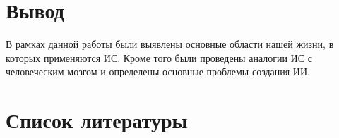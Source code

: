 \documentclass[14pt,a4paper,report]{report}
\begin{document}
\section{Вывод}

В рамках данной работы были выявлены основные области нашей жизни, в которых применяются ИС. Кроме того были проведены аналогии ИС с человеческим мозгом и определены основные проблемы создания ИИ.

\clearpage

\section{Список литературы}


\end{document}
